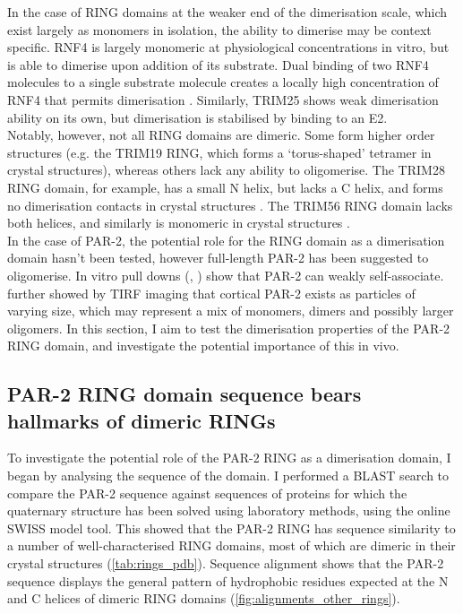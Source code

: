 \documentclass[12pt]{"report"}
\begin{document}

In the case of RING domains at the weaker end of the dimerisation scale, which exist largely as monomers in isolation, the ability to dimerise may be context specific. RNF4 is largely monomeric at physiological concentrations in vitro, but is able to dimerise upon addition of its substrate. Dual binding of two RNF4 molecules to a single substrate molecule creates a locally high concentration of RNF4 that permits dimerisation \citep{Rojas-Fernandez2014}. Similarly, TRIM25 shows weak dimerisation ability on its own, but dimerisation is stabilised by binding to an E2. \\

Notably, however, not all RING domains are dimeric.  Some form higher order structures (e.g. the TRIM19 RING, which forms a ‘torus-shaped’ tetramer in crystal structures), whereas others lack any ability to oligomerise. The TRIM28 RING domain, for example, has a small N helix, but lacks a C helix, and forms no dimerisation contacts in crystal structures \citep{Stevens2019}. The TRIM56 RING domain lacks both helices, and similarly is monomeric in crystal structures \citep{Fiskin2017}.\\


In the case of PAR-2, the potential role for the RING domain as a dimerisation domain hasn't been tested, however full-length PAR-2 has been suggested to oligomerise. In vitro pull downs (\cite{Motegi2011}, \cite{Arata2016}) show that PAR-2 can weakly self-associate. \textcite{Arata2016} further showed by TIRF imaging that cortical PAR-2 exists as particles of varying size, which may represent a mix of monomers, dimers and possibly larger oligomers. In this section, I aim to test the dimerisation properties of the PAR-2 RING domain, and investigate the potential importance of this in vivo.\\

\subsection{PAR-2 RING domain sequence bears hallmarks of dimeric RINGs}

To investigate the potential role of the PAR-2 RING as a dimerisation domain, I began by analysing the sequence of the domain. I performed a BLAST search to compare the PAR-2 sequence against sequences of proteins for which the quaternary structure has been solved using laboratory methods, using the online SWISS model tool. This showed that the PAR-2 RING has sequence similarity to a number of well-characterised RING domains, most of which are dimeric in their crystal structures (\cref{tab:rings_pdb}). Sequence alignment shows that the PAR-2 sequence displays the general pattern of hydrophobic residues expected at the N and C helices of dimeric RING domains (\cref{fig:alignments_other_rings}).\\
\end{document}
